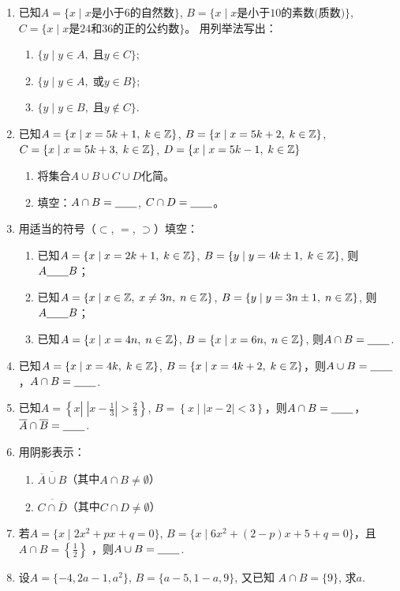 \begin{enumerate}
    \item 已知$A=\{x\mid x\text{是小于6的自然数}\}$, 
    $B=\{x\mid x\text{是小于10的素数(质数)}\}$,  $C=\{x\mid x\text{是24和36的正的公约数}\}$。
    用列举法写出： 
\begin{enumerate}[(1)]
    \item $\{y\mid y\in A,\;\text{且} y\in C\}$;
    \item $\{y\mid y\in A,\;\text{或} y\in B\}$;
    \item $\{y\mid y\in B,\; \text{且}y\notin C\}$.
\end{enumerate}
  \item 已知$A=\{x\mid x=5k+1,\; k\in \mathbb{Z}\}$, $B=\{x\mid x=5k+2,\; k\in \mathbb{Z}\}$, $C=\{x\mid x=5k+3,\; k\in \mathbb{Z}\}$, $D=\{x\mid x=5k-1,\; k\in \mathbb{Z}\}$
  \begin{enumerate}[(1)]
    \item 将集合$A\cup B\cup C\cup D$化简。
    \item 填空：$A\cap B=\underline{\qquad}$, $C\cap D=\underline{\qquad}$。
  \end{enumerate}

\item  用适当的符号（$\subset$, $=$, $\supset$）填空：
\begin{enumerate}[(1)]
    \item 已知$A=\{x\mid x=2k+1,\; k\in \mathbb{Z}\}$, $B=\{y\mid y=4k\pm 1,\; k\in \mathbb{Z}\}$, 则$A\underline{\qquad} B$；
    \item 已知$A=\{x\mid x\in\mathbb{Z},\; x\ne 3n,\; n\in \mathbb{Z}\}$, $B=\{y\mid y=3n\pm 1,\; n\in \mathbb{Z}\}$, 则$A\underline{\qquad} B$；
    \item 已知$A=\{x\mid x=4n,\; n\in \mathbb{Z}\}$, $B=\{x\mid x=6n,\; n\in \mathbb{Z}\}$, 则$A\cap B=\underline{\qquad} $.
\end{enumerate}

\item 已知$A=\{x\mid x=4k,\; k\in \mathbb{Z}\}$, $B=\{x\mid x=4k+2,\; k\in \mathbb{Z}\}$，则$A\cup B=\underline{\qquad}$，$A\cap B=\underline{\qquad}$.

\item 已知$A=\left\{x\left|\; \left|x-\frac{1}{3}\right|>\frac{2}{3}\right.\right\}$, $B=\left\{x\mid |x-2|<3\right\}$，则$A\cap B=\underline{\qquad}$，$\overline{A}\cap \overline{B}=\underline{\qquad}$.

\item 用阴影表示：
\begin{enumerate}[(1)]
    \item $\overline{\overline{A}\cup B}$（其中$A\cap B\ne \emptyset$）
    \item $\overline{C\cap \overline{D}}$（其中$C\cap D\ne \emptyset$）
\end{enumerate}

\item 若$A=\{x\mid 2x^{2}+px+q=0\}$, $B=\{x\mid 6x^{2}+\left(2-p\right)x+5+q=0\}$，且$A \cap B=\left\{\frac{1}{2}\right\}$
，则$A\cup B=\underline{\qquad}$.
\item 设$A=\{-4, 2a-1,a^{2}\}$, $B=\{a-5,1-a,9\}$, 又已知
    $A\cap B=\{9\}$, 求$a$.
\end{enumerate}


